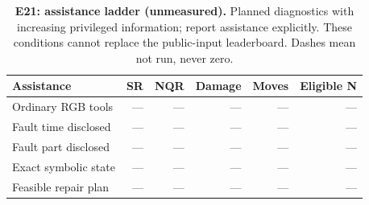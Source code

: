 \begin{table}[!ht]
\centering\small
\caption{\textbf{E21: assistance ladder (unmeasured).} Planned diagnostics with increasing privileged information; report assistance explicitly. These conditions cannot replace the public-input leaderboard. Dashes mean not run, never zero.}
\begin{tabularx}{\textwidth}{@{}Xrrrrr@{}}\toprule
Assistance & SR & NQR & Damage & Moves & Eligible N\\\midrule
Ordinary RGB tools & --- & --- & --- & --- & ---\\
Fault time disclosed & --- & --- & --- & --- & ---\\
Fault part disclosed & --- & --- & --- & --- & ---\\
Exact symbolic state & --- & --- & --- & --- & ---\\
Feasible repair plan & --- & --- & --- & --- & ---\\
\bottomrule
\end{tabularx}
\end{table}
